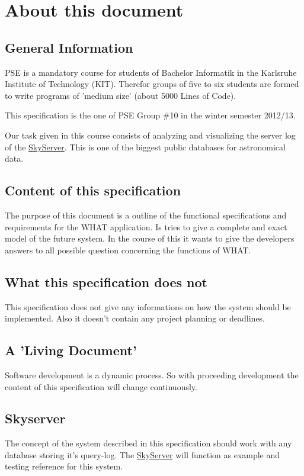 \section*{About this document}

\subsection*{General Information}
PSE is a mandatory course for students of Bachelor Informatik in the %
Karlsruhe Institute of Technology (KIT). Therefor groups of five to six
students are formed to write programs of 'medium size' (about 5000 Lines of Code).

This specification is the one of PSE Group \#10 in the winter semester 2012/13.

Our task given in this course consists of
analyzing and visualizing the server log of the 
\href{http://skyserver.sdss.org/public/en/}{SkyServer}.
This is one of the biggest public databases for astronomical data. 


\subsection*{Content of this specification}
The purpose of this document is a outline of the functional specifications and requirements
for the WHAT application. Is tries to give a complete and exact model of the future system.
In the course of this it wants to give the developers answers to all possible question concerning
the functions of WHAT.


\subsection*{What this specification does not}
This specification does not give any informations on how the system should be implemented. Also it doesn't 
contain any project planning or deadlines.


\subsection*{A 'Living Document'}
Software development is a dynamic process. So with proceeding development the
content of this specification will change continuously. 


\subsection*{Skyserver}
The concept of the system described in this specification should work with any database
storing it's query-log. The \href{http://skyserver.sdss.org/public/en/}{SkyServer} will function
as example and testing reference for this system.


